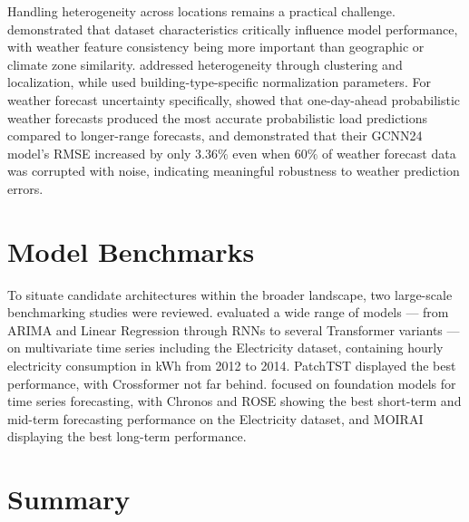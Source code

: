 Handling heterogeneity across locations remains a practical challenge. \citet{spencer2024}
demonstrated that dataset characteristics critically influence model performance, with
weather feature consistency being more important than geographic or climate zone
similarity. \citet{grabner2023} addressed heterogeneity through clustering and
localization, while \citet{moveh2025a} used building-type-specific normalization
parameters. For weather forecast uncertainty specifically, \citet{xu2025} showed that
one-day-ahead probabilistic weather forecasts produced the most accurate probabilistic
load predictions compared to longer-range forecasts, and \citet{cai2019} demonstrated
that their GCNN24 model's RMSE increased by only $3.36\%$ even when $60\%$ of weather
forecast data was corrupted with noise, indicating meaningful robustness to weather
prediction errors.

\section{Model Benchmarks}
\label{sec:benchmarks}

To situate candidate architectures within the broader landscape, two large-scale
benchmarking studies were reviewed. \citet{qiu2024tfb} evaluated a wide range of models
--- from ARIMA and Linear Regression through RNNs to several Transformer variants --- on
multivariate time series including the Electricity dataset, containing hourly electricity
consumption in kWh from 2012 to 2014. PatchTST displayed the best performance, with
Crossformer not far behind. \citet{li2024tsfmbench} focused on foundation models for time
series forecasting, with Chronos and ROSE showing the best short-term and mid-term
forecasting performance on the Electricity dataset, and MOIRAI displaying the best
long-term performance.

\section{Summary}

